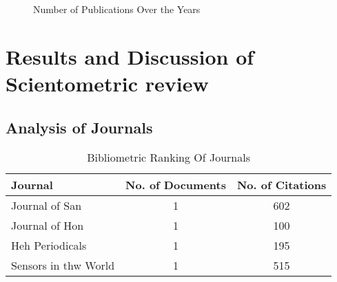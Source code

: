 \documentclass[journal, a4paper]{IEEEtran}
\begin{document}
\begin{figure}
  \centering
  \caption{Number of Publications Over the Years}
  \label{fig:publications}
\end{figure}

\lipsum[1]


\section{Results and Discussion of Scientometric review}
\lipsum[1]


\subsection{Analysis of Journals}
\lipsum[1]


\begin{table}[htbp]

  \centering
  \caption{Bibliometric Ranking Of Journals}
  \label{tbl:bibliometricRanking}
  \begin{tabular}{lcc}

      \toprule
      \textbf{Journal} & \textbf{No. of Documents} & \textbf{No. of Citations} \\
      \midrule
      Journal of San                   & 1     & 602   \\
      Journal of Hon                   & 1     & 100   \\
      Heh Periodicals                  & 1     & 195   \\
      Sensors in thw World             & 1     & 515   \\
      \bottomrule
  \end{tabular}
\end{table}
\end{document}
